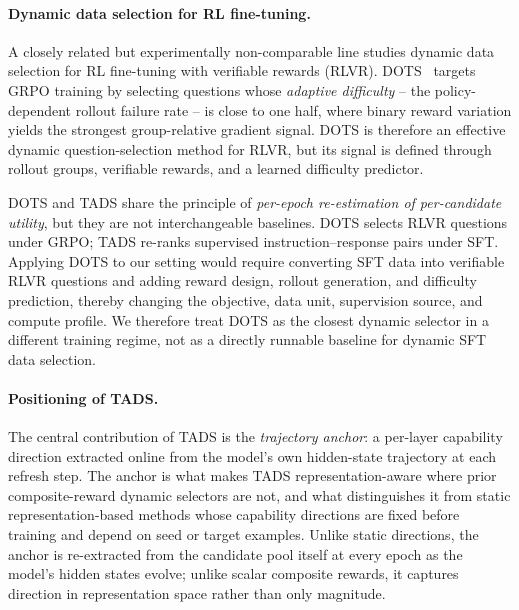 \paragraph{Dynamic data selection for RL fine-tuning.}
A closely related but experimentally non-comparable line studies
dynamic data selection for RL fine-tuning with verifiable rewards
(RLVR). DOTS~\cite{sun2025dots} targets GRPO training by selecting
questions whose \emph{adaptive difficulty} -- the policy-dependent
rollout failure rate -- is close to one half, where binary reward
variation yields the strongest group-relative gradient signal. DOTS
is therefore an effective dynamic question-selection method for
RLVR, but its signal is defined through rollout groups, verifiable
rewards, and a learned difficulty predictor.

DOTS and \textsc{TADS} share the principle of \emph{per-epoch
re-estimation of per-candidate utility}, but they are not
interchangeable baselines. DOTS selects RLVR questions under GRPO;
\textsc{TADS} re-ranks supervised instruction--response pairs under
SFT. Applying DOTS to our setting would require converting SFT data
into verifiable RLVR questions and adding reward design, rollout
generation, and difficulty prediction, thereby changing the
objective, data unit, supervision source, and compute profile. We
therefore treat DOTS as the closest dynamic selector in a different
training regime, not as a directly runnable baseline for dynamic
SFT data selection.

\paragraph{Positioning of \textsc{TADS}.}
The central contribution of \textsc{TADS} is the \emph{trajectory
anchor}: a per-layer capability direction extracted online from
the model's own hidden-state trajectory at each refresh step. The
anchor is what makes \textsc{TADS} representation-aware where
prior composite-reward dynamic selectors are not, and what
distinguishes it from static representation-based methods whose
capability directions are fixed before training and depend on seed
or target examples. Unlike static directions, the anchor is
re-extracted from the candidate pool itself at every epoch as the
model's hidden states evolve; unlike scalar composite rewards, it
captures direction in representation space rather than only
magnitude.


